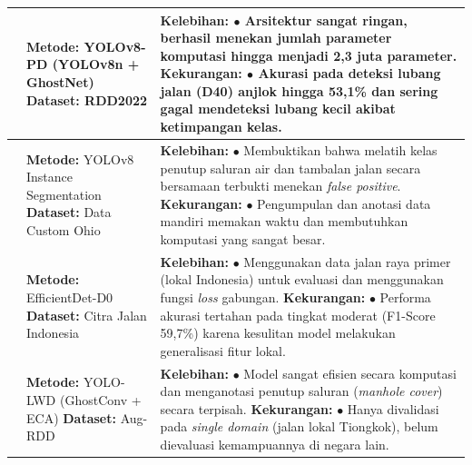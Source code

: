 \begin{longtable}{>{\raggedright}p{1.4cm}>{\raggedright}p{3.3cm}>{\raggedright\arraybackslash}p{7.8cm}}
  \hline
  \cite{Zeng2024}             & \textbf{Metode:} YOLOv8-PD (YOLOv8n + GhostNet) \newline \textbf{Dataset:} RDD2022                                          & \textbf{Kelebihan:} \newline $\bullet$ Arsitektur sangat ringan, berhasil menekan jumlah parameter komputasi hingga menjadi 2,3 juta parameter. \newline \textbf{Kekurangan:} \newline $\bullet$ Akurasi pada deteksi lubang jalan (D40) anjlok hingga 53,1\% dan sering gagal mendeteksi lubang kecil akibat ketimpangan kelas.                                    \\
  \hline
  \cite{matouq2024ai}         & \textbf{Metode:} YOLOv8 Instance Segmentation \newline \textbf{Dataset:} Data Custom Ohio                                   & \textbf{Kelebihan:} \newline $\bullet$ Membuktikan bahwa melatih kelas penutup saluran air dan tambalan jalan secara bersamaan terbukti menekan \textit{false positive}. \newline \textbf{Kekurangan:} \newline $\bullet$ Pengumpulan dan anotasi data mandiri memakan waktu dan membutuhkan komputasi yang sangat besar.                                           \\
  \hline
  \cite{hugo2025efficientdet} & \textbf{Metode:} EfficientDet-D0 \newline \textbf{Dataset:} Citra Jalan Indonesia                                           & \textbf{Kelebihan:} \newline $\bullet$ Menggunakan data jalan raya primer (lokal Indonesia) untuk evaluasi dan menggunakan fungsi \textit{loss} gabungan. \newline \textbf{Kekurangan:} \newline $\bullet$ Performa akurasi tertahan pada tingkat moderat (F1-Score 59,7\%) karena kesulitan model melakukan generalisasi fitur lokal.                              \\
  \hline
  \cite{Shi_2026}             & \textbf{Metode:} YOLO-LWD (GhostConv + ECA) \newline \textbf{Dataset:} Aug-RDD                                              & \textbf{Kelebihan:} \newline $\bullet$ Model sangat efisien secara komputasi dan menganotasi penutup saluran (\textit{manhole cover}) secara terpisah. \newline \textbf{Kekurangan:} \newline $\bullet$ Hanya divalidasi pada \textit{single domain} (jalan lokal Tiongkok), belum dievaluasi kemampuannya di negara lain.                                          \\

\end{longtable}
